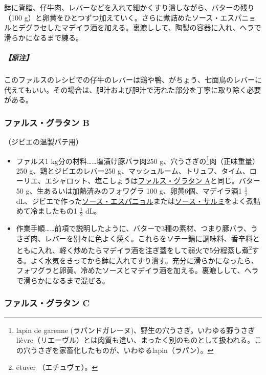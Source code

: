 \begin{recette}
鉢に背脂、仔牛肉、レバーなどを入れて細かくすり潰しながら、バターの残り（100
g）と卵黄をひとつずつ加えていく。さらに煮詰めたソース・エスパニョルとデグラセしたマデイラ酒を加える。裏漉しして、陶製の容器に入れ、ヘラで滑らかになるまで練る。

\hypertarget{nota-farce-gratin-a}{%
\subparagraph{【原注】}\label{nota-farce-gratin-a}}

このファルスのレシピでの仔牛のレバーは鶏や鴨、がちょう、七面鳥のレバーに代えてもいい。その場合は、胆汁および胆汁で汚れた部分を丁寧に取り除く必要がある。

\hypertarget{farce-gratin-b}{%
\subsubsection{ファルス・グラタン B}\label{farce-gratin-b}}


（ジビエの温製パテ用）


\begin{itemize}
\item
  ファルス1 kg分の材料\ldots{}\ldots{}塩漬け豚バラ肉250
  g、穴うさぎの\footnote{lapin de garenne
    (ラパンドガレーヌ)、野生の穴うさぎ。いわゆる野うさぎlièvre（リエーヴル）とは肉質も違い、まったく別のものとして扱われる。この穴うさぎを家畜化したものが、いわゆるlapin（ラパン）。}肉（正味重量）250
  g、鶏とジビエのレバー250
  g、マッシュルーム、トリュフ、タイム、ローリエ、エシャロット、塩こしょうは\protect\hyperlink{farce-gratin-a}{ファルス・グラタン
  A}と同じ。バター50 g、生あるいは加熱済みのフォワグラ 100
  g、卵黄6個、マデイラ酒1 \(\frac{1}{2}\)
  dL、ジビエで作った\protect\hyperlink{sauce-espagnole}{ソース・エスパニョル}または\protect\hyperlink{sauce-salmis}{ソース・サルミ}をよく煮詰めて冷ましたもの1
  \(\frac{1}{2}\) dL。
\item
  作業手順\ldots{}\ldots{}前項で説明したように、バターで3種の素材、つまり豚バラ、うさぎ肉、レバーを別々に色よく焼く。これらをソテー鍋に調味料、香辛料とともに入れ、軽く炒めたらマデイラ酒を注ぎ蓋をして弱火で5分程蒸し煮\footnote{étuver
    （エチュヴェ）。}する。よく水気をきってから鉢に入れてすり潰す。充分に滑らかになったら、フォワグラと卵黄、冷めたソースとマデイラ酒を加える。裏漉しして、ヘラで滑らかになるまで混ぜる。
\end{itemize}

\hypertarget{farce-gratin-c}{%
\subsubsection{ファルス・グラタン C}\label{farce-gratin-c}}


\end{recette}
